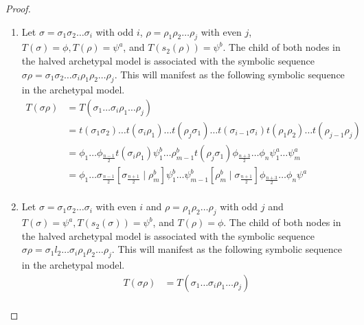 \begin{proof} \phantom{x}
	\begin{enumerate}
		\item Let $\sigma = \sigma_1\sigma_2 \dots \sigma_i$ with odd $i$, $\rho = \rho_1\rho_2 \dots \rho_j$ with even $j$, $T(\sigma) = \phi, T(\rho) = \psi^a$, and $T(s_2(\rho)) = \psi^b$.
		      The child of both nodes in the halved archetypal model is associated with the symbolic sequence $\sigma\rho = \sigma_1\sigma_2 \dots \sigma_i \rho_1\rho_2 \dots \rho_j$.
		      This will manifest as the following symbolic sequence in the archetypal model.
		      \begin{align*}
			      T(\sigma\rho) & = T(\sigma_1 \dots \sigma_i \rho_1 \dots \rho_j)                                                                              \\
			                    & =
			      t(\sigma_1\sigma_2) \dots t(\sigma_i \rho_1) \dots t(\rho_j \sigma_1) \dots t(\sigma_{i-1}\sigma_i) t(\rho_1\rho_2) \dots t(\rho_{j-1}\rho_j) \\
			                    & = \phi_1 \dots \phi_{\frac{n-1}{2}} t(\sigma_i \rho_1)
			      \psi^b_1 \dots \rho^b_{m-1} t(\rho_j \sigma_1)
			      \phi_{\frac{n+3}{2}} \dots \phi_n
			      \psi^a_1 \dots \psi^a_m                                                                                                                       \\
			                    & =
			      \phi_1 \dots \sigma_{\frac{n-1}{2}} \left[\sigma_{\frac{n+1}{2}} \mid \rho^b_m\right]
			      \psi^b_1 \dots \psi^b_{m-1} \left[\rho^b_m \mid \sigma_{\frac{n+1}{2}}\right]
			      \phi_{\frac{n+3}{2}} \dots \phi_n
			      \psi^a                                                                                                                                        \\
		      \end{align*}
		\item Let $\sigma = \sigma_1\sigma_2 \dots \sigma_i$ with even $i$ and $\rho = \rho_1\rho_2 \dots \rho_j$ with odd $j$ and $T(\sigma) = \psi^a, T(s_2(\sigma)) = \psi^b$, and $T(\rho) = \phi$.
		      The child of both nodes in the halved archetypal model is associated with the symbolic sequence $\sigma\rho = \sigma_1l_2 \dots \sigma_i \rho_1\rho_2 \dots \rho_j$.
		      This will manifest as the following symbolic sequence in the archetypal model.
		      \begin{align*}
			      T(\sigma\rho) & = T(\sigma_1 \dots \sigma_i \rho_1 \dots \rho_j)                                                                                             \\

\end{align*}
\end{enumerate}
\end{proof}
